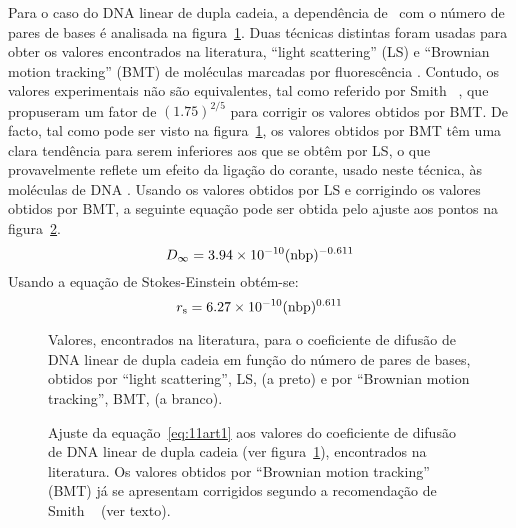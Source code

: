 Para o caso do DNA linear de dupla cadeia, a dependência de \dinf\ com o número de pares de bases é analisada na figura~\ref{fig:2aart1}. Duas técnicas distintas foram usadas para obter os valores encontrados na literatura, ``light scattering'' (LS) \cite{lewis,sorlie,voordouw,newman,nguyen} e ``Brownian motion tracking'' (BMT) de moléculas marcadas por fluorescência \cite{robertson,smith,araki,lukacs}. 
%
%
%
%
Contudo, os valores experimentais não são equivalentes, tal como referido por Smith \et\ \cite{smith}, que propuseram um fator de $(1.75)^{2/5}$ para corrigir os valores obtidos por BMT. De facto, tal como pode ser visto na figura~\ref{fig:2aart1}, os valores obtidos por BMT têm uma clara tendência para serem inferiores aos que se obtêm por LS, o que provavelmente reflete um efeito da ligação do corante, usado neste técnica, às moléculas de DNA \cite{smith}. Usando os valores obtidos por LS e corrigindo os valores obtidos por BMT, a seguinte equação pode ser obtida pelo ajuste aos pontos na figura~\ref{fig:2bart1}. 
\begin{equation}
\label{eq:11art1}
D_{\mathit{\infty}}=3.94 \times 10^{-10}(\mathrm{nbp})^{-0.611}
\end{equation}
Usando a equação de Stokes-Einstein obtém-se:
%
\begin{equation}%
\label{eq:12art1}
\raiostokes=6.27\times 10^{-10}(\numpb)^{0.611}
\end{equation}%
\begin{figure}%
	\centering
	\setlength\figureheight{6cm} 
	\setlength\figurewidth{6cm}
	
	\caption[Coeficiente de difusão de DNA linear de dupla cadeia]{Valores, encontrados na literatura, para o coeficiente de difusão de DNA linear de dupla cadeia em função do número de pares de bases, obtidos por ``light scattering'', LS,  (a preto) e por ``Brownian motion tracking'', BMT, (a branco).}
	\label{fig:2aart1}
\end{figure}%
\begin{figure}%
	\centering
	\setlength\figureheight{6cm} 
	\setlength\figurewidth{6cm}
	
	\caption[Ajuste aos valores do coeficiente de difusão de dsDNA]{Ajuste da equação~\ref{eq:11art1} aos valores do coeficiente de difusão de DNA linear de dupla cadeia (ver figura~\ref{fig:2aart1}), encontrados na literatura. Os valores obtidos por ``Brownian motion tracking'' (BMT) já se apresentam corrigidos segundo a recomendação de Smith \et\ \cite{smith} (ver texto).}
	\label{fig:2bart1}
\end{figure}%
